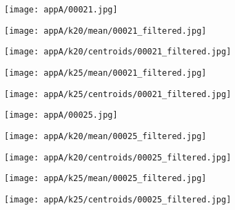 \documentclass[draft,final]{vutinfth} %
\begin{document}
\begin{appendices}
\begin{figure}[h]
\centering
  \begin{subfigure}[t]{0.19\columnwidth}
    \centering
    \texttt{[image: appA/00021.jpg]}
  \end{subfigure}
  \begin{subfigure}[t]{0.19\columnwidth}
    \centering
    \texttt{[image: appA/k20/mean/00021\_filtered.jpg]}
  \end{subfigure}
  \begin{subfigure}[t]{0.19\columnwidth}
    \centering
    \texttt{[image: appA/k20/centroids/00021\_filtered.jpg]}
  \end{subfigure}
  \begin{subfigure}[t]{0.19\columnwidth}
    \centering
    \texttt{[image: appA/k25/mean/00021\_filtered.jpg]}
  \end{subfigure}
  \begin{subfigure}[t]{0.19\columnwidth}
    \centering
    \texttt{[image: appA/k25/centroids/00021\_filtered.jpg]}
  \end{subfigure}
\caption{}
\end{figure}  

\begin{figure}[h]
\centering
  \begin{subfigure}[t]{0.19\columnwidth}
    \centering
    \texttt{[image: appA/00025.jpg]}
  \end{subfigure}
  \begin{subfigure}[t]{0.19\columnwidth}
    \centering
    \texttt{[image: appA/k20/mean/00025\_filtered.jpg]}
  \end{subfigure}
  \begin{subfigure}[t]{0.19\columnwidth}
    \centering
    \texttt{[image: appA/k20/centroids/00025\_filtered.jpg]}
  \end{subfigure}
  \begin{subfigure}[t]{0.19\columnwidth}
    \centering
    \texttt{[image: appA/k25/mean/00025\_filtered.jpg]}
  \end{subfigure}
  \begin{subfigure}[t]{0.19\columnwidth}
    \centering
    \texttt{[image: appA/k25/centroids/00025\_filtered.jpg]}
  \end{subfigure}
\caption{}
\end{figure}  


\end{appendices}
\end{document}
